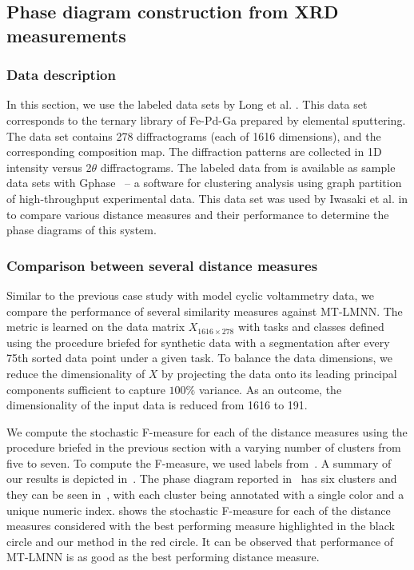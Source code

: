 

\subsection{Phase diagram construction from XRD measurements}

\subsubsection{Data description}
In this section, we use the labeled data sets by Long et al. \cite{long2007rapid}. 
This data set corresponds to the ternary library of Fe-Pd-Ga prepared by elemental sputtering. 
The data set contains 278 diffractograms (each of 1616 dimensions), and the corresponding composition map. 
The diffraction patterns are collected in 1D intensity versus 2$\theta$ diffractograms. 
The labeled data from \cite{long2007rapid} is available as sample data sets with Gphase~\cite{xiong2017automated} -- a software for clustering analysis using graph partition of high-throughput experimental data.
This data set was used by Iwasaki et al. in\cite{iwasaki2017comparison} to compare various distance measures and their performance to determine the phase diagrams of this system. 


\subsubsection{Comparison between several distance measures}
Similar to the previous case study with model cyclic voltammetry data, we compare the performance of several similarity measures against MT-LMNN.
The metric is learned on the data matrix $X_{1616\times278}$ with tasks and classes defined using the procedure briefed for synthetic data with a segmentation after every 75th sorted data point under a given task. 
To balance the data dimensions, we reduce the dimensionality of $X$ by projecting the data onto its leading principal components sufficient to capture \(100\%\) variance. 
As an outcome, the dimensionality of the input data is reduced from 1616 to 191. 


We compute the stochastic F-measure for each of the distance measures using the procedure briefed in the previous section with a varying number of clusters from five to seven. 
To compute the F-measure, we used labels from~\cite{long2007rapid}.
A summary of our results is depicted in~. 
The phase diagram reported in~\cite{long2007rapid} has six clusters and they can be seen in~, with each cluster being annotated with a single color and a unique numeric index.
 shows the stochastic F-measure for each of the distance measures considered with the best performing measure highlighted in the black circle and our method in the red circle. 
It can be observed that performance of MT-LMNN is as good as the best performing distance measure. 


